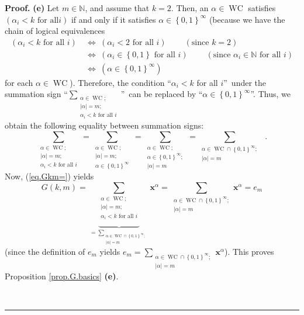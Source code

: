 \documentclass[numbers=enddot,12pt,final,onecolumn,notitlepage]{scrartcl}%
\theoremstyle{definition}
\newenvironment{proof}[1][Proof]{\noindent\textbf{#1.} }{\ \rule{0.5em}{0.5em}}
\let\sumnonlimits\sum
\renewcommand{\sum}{\sumnonlimits\limits}
\newenvironment{verlong}{}{}
\begin{document}
\begin{verlong}
\begin{proof}
\textbf{(e)} Let $m\in\mathbb{N}$, and assume that $k=2$. Then, an $\alpha
\in\operatorname*{WC}$ satisfies $\left(  \alpha_{i}<k\text{ for all
}i\right)  $ if and only if it satisfies $\alpha\in\left\{  0,1\right\}
^{\infty}$ (because we have the chain of logical equivalences%
\begin{align*}
\left(  \alpha_{i}<k\text{ for all }i\right)  \  &  \Longleftrightarrow
\ \left(  \alpha_{i}<2\text{ for all }i\right)  \ \ \ \ \ \ \ \ \ \ \left(
\text{since }k=2\right) \\
&  \Longleftrightarrow\ \left(  \alpha_{i}\in\left\{  0,1\right\}  \text{ for
all }i\right)  \ \ \ \ \ \ \ \ \ \ \left(  \text{since }\alpha_{i}%
\in\mathbb{N}\text{ for all }i\right) \\
&  \Longleftrightarrow\ \left(  \alpha\in\left\{  0,1\right\}  ^{\infty
}\right)
\end{align*}
for each $\alpha\in\operatorname*{WC}$). Therefore, the condition
\textquotedblleft$\alpha_{i}<k$ for all $i$\textquotedblright\ under the
summation sign \textquotedblleft$\sum_{\substack{\alpha\in\operatorname*{WC}%
;\\\left\vert \alpha\right\vert =m;\\\alpha_{i}<k\text{ for all }i}%
}$\textquotedblright\ can be replaced by \textquotedblleft$\alpha\in\left\{
0,1\right\}  ^{\infty}$\textquotedblright. Thus, we obtain the following
equality between summation signs:%
\[
\sum_{\substack{\alpha\in\operatorname*{WC};\\\left\vert \alpha\right\vert
=m;\\\alpha_{i}<k\text{ for all }i}}=\sum_{\substack{\alpha\in
\operatorname*{WC};\\\left\vert \alpha\right\vert =m;\\\alpha\in\left\{
0,1\right\}  ^{\infty}}}=\sum_{\substack{\alpha\in\operatorname*{WC}%
;\\\alpha\in\left\{  0,1\right\}  ^{\infty};\\\left\vert \alpha\right\vert
=m}}=\sum_{\substack{\alpha\in\operatorname*{WC}\cap\left\{  0,1\right\}
^{\infty};\\\left\vert \alpha\right\vert =m}}\ \ .
\]
Now, (\ref{eq.Gkm=}) yields%
\[
G\left(  k,m\right)  =\underbrace{\sum_{\substack{\alpha\in\operatorname*{WC}%
;\\\left\vert \alpha\right\vert =m;\\\alpha_{i}<k\text{ for all }i}}}%
_{=\sum_{\substack{\alpha\in\operatorname*{WC}\cap\left\{  0,1\right\}
^{\infty};\\\left\vert \alpha\right\vert =m}}}\mathbf{x}^{\alpha}%
=\sum_{\substack{\alpha\in\operatorname*{WC}\cap\left\{  0,1\right\}
^{\infty};\\\left\vert \alpha\right\vert =m}}\mathbf{x}^{\alpha}=e_{m}%
\]
(since the definition of $e_{m}$ yields $e_{m}=\sum_{\substack{\alpha
\in\operatorname*{WC}\cap\left\{  0,1\right\}  ^{\infty};\\\left\vert
\alpha\right\vert =m}}\mathbf{x}^{\alpha}$). This proves Proposition
\ref{prop.G.basics} \textbf{(e)}.


\end{proof}
\end{verlong}
\end{document}
